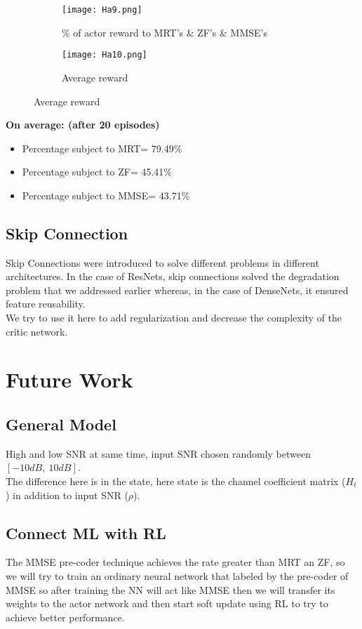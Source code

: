 \begin{description}
\begin{figure}[H]
\begin{subfigure}{.5\textwidth}
          \centering
          \texttt{[image: Ha9.png]}
          \caption{\% of actor reward to MRT's \& ZF's \& MMSE's}
          \label{fig:tanh}
        \end{subfigure}%
        \begin{subfigure}{.5\textwidth}
          \centering
          \texttt{[image: Ha10.png]}
          \caption{Average reward}
          \label{fig:tanh-1}
        \end{subfigure}
    \end{figure}
    \textbf{On average: (after 20 episodes)}
    \begin{itemize}
        \item Percentage subject to MRT= 79.49\% 
        \item Percentage subject to ZF= 45.41\% 
        \item Percentage subject to MMSE= 43.71\%
    \end{itemize}
\end{description}
\subsection{Skip Connection}
Skip Connections were introduced to solve different problems in different architectures. In the case of ResNets, skip connections solved the degradation problem that we addressed earlier whereas, in the case of DenseNets, it ensured feature reusability. \\
We try to use it here to add regularization and decrease the complexity of the critic network.

\section{Future Work}
\subsection{General Model}
High and low SNR at same time, input SNR chosen randomly between $[-10dB,\ 10dB]$.\\
The difference here is in the state, here state is the channel coefficient matrix ($H_t$) in addition to input SNR ($\rho$).
\subsection{Connect ML with RL}
The MMSE pre-coder technique achieves the rate greater than MRT an ZF, so we will try to train an ordinary neural network that labeled by the pre-coder of MMSE so after training the NN will act like MMSE then we will transfer its weights to the actor network and then start soft update using RL to try to achieve better performance.
